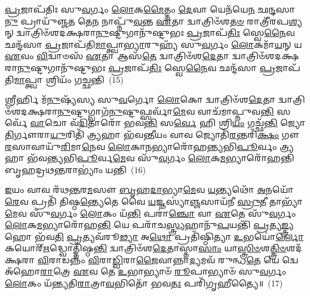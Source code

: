 {\anuvakamend[{𑌓𑌷᳴𑌧𑍀𑌃 𑌸𑌂𑌵\-\ul{𑌥𑍍𑌸}\-𑌰 \ul{𑌏}\-𑌵𑌾𑌵᳴ 𑌪𑍍𑌰\-\ul{𑌤𑌿}\-𑌷𑍍𑌠𑌾\-\ul{𑌯} 𑌵𑍍𑌯𑌤𑌿᳴\-\ul{𑌷}\-𑌕𑍍𑌤𑍈\-\ul{𑌕𑌾}\-𑌨𑍍𑌨𑌪᳴\-\ul{𑌞𑍍𑌚𑌾}\-𑌶𑌚𑍍𑌚᳴}]}%

\-\ul{𑌪𑍍𑌰}\-𑌜𑌾𑌪᳴𑌤𑌿𑌃 𑌸𑍁\-\ul{𑌵}\-𑌰𑍍𑌗𑌂 \ul{𑌲𑍋}\-𑌕\-\ul{𑌮𑍈}\-𑌤𑍍𑌤𑌂 \ul{𑌦𑍇}\-𑌵𑌾 𑌯𑍇𑌨᳴𑌯𑍇\-\ul{𑌨} 𑌛\-\ul{𑌨𑍍𑌦}\-𑌸𑌾\-\ul{𑌨𑍁} 𑌪𑍍𑌰𑌾𑌯𑍁᳴𑌞𑍍𑌜\-\ul{𑌤} 𑌤𑍇\-\ul{𑌨} 𑌨𑌾𑌪𑍍𑌨𑍁᳴\-\ul{𑌵}\-𑌨𑍍𑌤 \ul{𑌏}\-𑌤𑌾 𑌦𑍍𑌵𑌾𑌤𑍍𑌰𑌿𑍞᳴𑌶\-\ul{𑌤}\-\-\ul{𑍞} 𑌰𑌾𑌤𑍍𑌰𑍀᳴𑌰𑌪\-\ul{𑌶𑍍𑌯}\-𑌨𑍍 𑌦𑍍𑌵𑌾𑌤𑍍𑌰𑌿𑍞᳴𑌶𑌦𑌕𑍍𑌷𑌰𑌾\-\ul{𑌨𑍁}\-𑌷𑍍𑌟𑍁𑌗𑌾𑌨𑍁᳴𑌷𑍍𑌟𑍁𑌭𑌃 \ul{𑌪𑍍𑌰}\-𑌜𑌾𑌪᳴\-\ul{𑌤𑌿𑌃} 𑌸𑍍𑌵𑍇\-\ul{𑌨𑍈}\-𑌵 𑌛𑌨𑍍𑌦᳴𑌸𑌾 \ul{𑌪𑍍𑌰}\-𑌜𑌾𑌪᳴𑌤𑌿\-\ul{𑌮𑌾}\-𑌪𑍍𑌤𑍍𑌵𑌾\-\ul{𑌭𑍍𑌯𑌾}\-𑌰𑍁𑌹𑍍𑌯᳴ 𑌸𑍁\-\ul{𑌵}\-𑌰𑍍𑌗𑌂 \ul{𑌲𑍋}\-𑌕𑌮𑌾᳴\-\ul{𑌯}\-𑌨𑍍 𑌯 \ul{𑌏}\-𑌵𑌂 \ul{𑌵𑌿}\-𑌦𑍍𑌵𑌾𑍞𑌸᳴ \ul{𑌏}\-𑌤𑌾 𑌆𑌸᳴\-\ul{𑌤𑍇} 𑌦𑍍𑌵𑌾𑌤𑍍𑌰𑌿𑍞᳴𑌶\-\ul{𑌦𑍇}\-𑌤𑌾 𑌦𑍍𑌵𑌾𑌤𑍍𑌰𑌿𑍞᳴𑌶𑌦𑌕𑍍𑌷𑌰𑌾\-\ul{𑌨𑍁}\-𑌷𑍍𑌟𑍁𑌗𑌾𑌨𑍁᳴𑌷𑍍𑌟𑍁𑌭𑌃 \ul{𑌪𑍍𑌰}\-𑌜𑌾𑌪᳴\-\ul{𑌤𑌿𑌃} 𑌸𑍍𑌵𑍇\-\ul{𑌨𑍈}\-𑌵 𑌛𑌨𑍍𑌦᳴𑌸𑌾 \ul{𑌪𑍍𑌰}\-𑌜𑌾𑌪᳴𑌤𑌿\-\ul{𑌮𑌾}\-𑌪𑍍𑌤𑍍𑌵𑌾 𑌶𑍍𑌰𑌿𑌯𑌂᳴ 𑌗𑌚𑍍𑌛𑌨𑍍𑌤𑌿~(15)

𑌶𑍍𑌰𑍀𑌰𑍍\mbox{}𑌹𑌿 𑌮᳴\-\ul{𑌨𑍁}\-𑌷𑍍𑌯᳴𑌸𑍍𑌯 𑌸𑍁\-\ul{𑌵}\-𑌰𑍍𑌗𑍋 \ul{𑌲𑍋}\-𑌕𑍋 𑌦𑍍𑌵𑌾𑌤𑍍𑌰𑌿𑍞᳴𑌶\-\ul{𑌦𑍇}\-𑌤𑌾 𑌦𑍍𑌵𑌾𑌤𑍍𑌰𑌿𑍞᳴𑌶𑌦𑌕𑍍𑌷𑌰𑌾\-\ul{𑌨𑍁}\-𑌷𑍍𑌟𑍁𑌗𑍍𑌵𑌾𑌗᳴\-\ul{𑌨𑍁}\-𑌷𑍍𑌟𑍁𑌫𑍍𑌸𑌰𑍍𑌵𑌾᳴\-\ul{𑌮𑍇}\-𑌵 𑌵𑌾𑌚᳴𑌮𑌾𑌪𑍍𑌨𑍁𑌵\-\ul{𑌨𑍍𑌤𑌿} 𑌸𑌰𑍍𑌵𑍇᳴ \ul{𑌵𑌾}\-𑌚𑍋 𑌵᳴\-\ul{𑌦𑌿}\-𑌤𑌾𑌰𑍋᳴ 𑌭𑌵\-\ul{𑌨𑍍𑌤𑌿} 𑌸\-\ul{𑌰𑍍𑌵𑍇} 𑌹𑌿 𑌶𑍍𑌰𑌿\-\ul{𑌯𑌂} 𑌗𑌚𑍍𑌛᳴\-\ul{𑌨𑍍𑌤𑌿} 𑌜𑍍𑌯𑍋\-\ul{𑌤𑌿}\-𑌰𑍍𑌗𑍗𑌰𑌾\-\ul{𑌯𑍁}\-𑌰𑌿𑌤𑌿᳴ \ul{𑌤𑍍𑌰𑍍𑌯}\-𑌹𑌾 𑌭᳴𑌵\-\ul{𑌨𑍍𑌤𑍀}\-𑌯𑌂 𑌵𑌾𑌵 𑌜𑍍𑌯𑍋𑌤𑌿᳴\-\ul{𑌰}\-𑌨𑍍𑌤𑌰𑌿᳴\-\ul{𑌕𑍍𑌷𑌂} 𑌗𑍗\-\ul{𑌰}\-𑌸𑌾𑌵𑌾𑌯𑍁᳴\-\-\ul{𑌰𑌿}\-𑌮𑌾\-\ul{𑌨𑍇}\-𑌵 \ul{𑌲𑍋}\-𑌕𑌾\-\ul{𑌨}\-𑌭𑍍𑌯𑌾𑌰𑍋᳴𑌹𑌨𑍍𑌤𑍍𑌯𑌭𑌿\-\ul{𑌪𑍂}\-𑌰𑍍𑌵𑌂 \ul{𑌤𑍍𑌰𑍍𑌯}\-𑌹𑌾 𑌭᳴𑌵𑌨𑍍𑌤𑍍𑌯𑌭𑌿\-\ul{𑌪𑍂}\-𑌰𑍍𑌵\-\ul{𑌮𑍇}\-𑌵 𑌸𑍁᳴\-\ul{𑌵}\-𑌰𑍍𑌗𑌂 \ul{𑌲𑍋}\-𑌕\-\ul{𑌮}\-𑌭𑍍𑌯𑌾𑌰𑍋᳴𑌹𑌨𑍍𑌤𑌿 𑌬𑍃𑌹𑌦𑍍𑌰𑌥\-\ul{𑌨𑍍𑌤}\-𑌰𑌾\-𑌭𑍍𑌯𑌾𑌂॑ 𑌯𑌨𑍍𑌤𑌿~(16)

\-\ul{𑌇}\-𑌯𑌂 𑌵𑌾𑌵 𑌰᳴𑌥\-\ul{𑌨𑍍𑌤}\-𑌰\-\ul{𑌮}\-𑌸𑍗 \ul{𑌬𑍃}\-𑌹\-\ul{𑌦𑌾}\-𑌭𑍍𑌯𑌾\-\ul{𑌮𑍇}\-𑌵 \ul{𑌯}\-𑌨𑍍𑌤𑍍𑌯𑌥𑍋᳴ \ul{𑌅}\-𑌨𑌯𑍋᳴\-\ul{𑌰𑍇}\-𑌵 𑌪𑍍𑌰𑌤𑌿᳴ 𑌤𑌿𑌷𑍍𑌠\-\ul{𑌨𑍍𑌤𑍍𑌯𑍇}\-𑌤𑍇 𑌵𑍈 \ul{𑌯}\-𑌜𑍍𑌞𑌸𑍍𑌯𑌾॑\-\ul{𑌞𑍍𑌜}\-𑌸𑌾𑌯᳴𑌨𑍀 \ul{𑌸𑍍𑌰𑍁}\-𑌤𑍀 𑌤𑌾𑌭𑍍𑌯𑌾᳴\-\ul{𑌮𑍇}\-𑌵 𑌸𑍁᳴\-\ul{𑌵}\-𑌰𑍍𑌗𑌂 \ul{𑌲𑍋}\-𑌕𑌂 𑌯᳴\-\ul{𑌨𑍍𑌤𑌿} 𑌪𑌰𑌾॑\-\ul{𑌞𑍍𑌚𑍋} 𑌵𑌾 \ul{𑌏}\-𑌤𑍇 𑌸𑍁᳴\-\ul{𑌵}\-𑌰𑍍𑌗𑌂 \ul{𑌲𑍋}\-𑌕\-\ul{𑌮}\-𑌭𑍍𑌯𑌾𑌰𑍋᳴𑌹\-\ul{𑌨𑍍𑌤𑌿} 𑌯𑍇 𑌪𑌰𑌾᳴𑌚\-\ul{𑌸𑍍𑌤𑍍𑌰𑍍𑌯}\-𑌹𑌾𑌨𑍁᳴\-\ul{𑌪}\-𑌯𑌨𑍍𑌤𑌿᳴ \ul{𑌪𑍍𑌰}\-𑌤𑍍𑌯\-\ul{𑌙𑍍𑌤𑍍𑌰𑍍𑌯}\-𑌹𑍋 𑌭᳴𑌵\-\ul{𑌤𑌿} \ul{𑌪𑍍𑌰}\-𑌤𑍍𑌯𑌵᳴𑌰𑍂\-\ul{𑌢𑍍𑌯𑌾} 𑌅\-\ul{𑌥𑍋} 𑌪𑍍𑌰𑌤𑌿᳴𑌷𑍍𑌠𑌿𑌤𑍍𑌯𑌾 \ul{𑌉}\-𑌭𑌯𑍋॑\-\ul{𑌰𑍍𑌲𑍋}\-𑌕𑌯𑍋𑌰𑍍\mbox{}᳴\-\ul{𑌋}\-𑌦𑍍𑌧𑍍𑌵𑍋𑌤𑍍𑌤𑌿᳴𑌷𑍍𑌠\-\ul{𑌨𑍍𑌤𑌿} 𑌦𑍍𑌵𑌾𑌤𑍍𑌰𑌿𑍞᳴𑌶\-\ul{𑌦𑍇}\-𑌤𑌾𑌸𑍍𑌤𑌾\-\ul{𑌸𑌾𑌂} 𑌯𑌾\-\ul{𑌸𑍍𑌤𑍍𑌰𑌿}\-\-\ul{𑍞}\-𑌶\-\ul{𑌤𑍍𑌤𑍍𑌰𑌿}\-\-\ul{𑍞}\-𑌶𑌦᳴𑌕𑍍𑌷𑌰𑌾 \ul{𑌵𑌿}\-𑌰𑌾𑌡𑌨𑍍𑌨𑌂᳴ \ul{𑌵𑌿}\-𑌰𑌾\-\ul{𑌡𑍍𑌵𑌿}\-𑌰𑌾\-\ul{𑌜𑍈}\-𑌵𑌾𑌨𑍍𑌨𑌾\-\ul{𑌦𑍍𑌯}\-𑌮𑌵᳴ 𑌰𑍁𑌨𑍍𑌧\-\ul{𑌤𑍇} 𑌯𑍇 𑌦𑍍𑌵𑍇 𑌅᳴𑌹𑍋\-\ul{𑌰𑌾}\-𑌤𑍍𑌰𑍇 \ul{𑌏}\-𑌵 𑌤𑍇 \ul{𑌉}\-𑌭𑌾𑌭𑍍𑌯𑌾𑍞᳴ \ul{𑌰𑍂}\-𑌪𑌾𑌭𑍍𑌯𑌾𑍞᳴ 𑌸𑍁\-\ul{𑌵}\-𑌰𑍍𑌗𑌂 \ul{𑌲𑍋}\-𑌕𑌂 𑌯᳴𑌨𑍍𑌤𑍍𑌯𑌤𑌿\-\ul{𑌰𑌾}\-𑌤𑍍𑌰𑌾\-\ul{𑌵}\-𑌭𑌿𑌤𑍋᳴ 𑌭𑌵\-\ul{𑌤𑌃} 𑌪𑌰𑌿᳴𑌗𑍃𑌹𑍀𑌤𑍍𑌯𑍈॥~(17)

{\anuvakamend[{\-\ul{𑌗}\-\-\ul{𑌚𑍍𑌛}\-\-\ul{𑌨𑍍𑌤𑌿} \ul{𑌯}\-\-\ul{𑌨𑍍𑌤𑌿} \ul{𑌤𑍍𑌰𑌿}\-\-\ul{𑍞}\-𑌶𑌦᳴𑌕𑍍𑌷\-\ul{𑌰𑌾} 𑌦𑍍𑌵𑌾𑌵𑌿𑍞᳴𑌶𑌤𑌿𑌶𑍍𑌚}]}%

